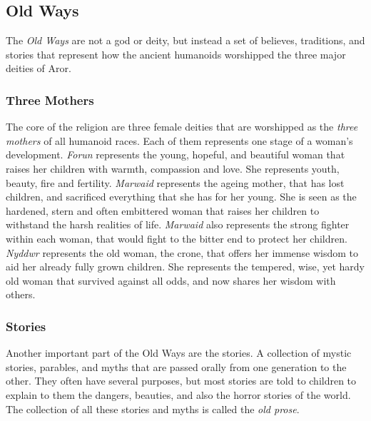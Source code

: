 \subsection{Old Ways}

The \emph{Old Ways} are not a god or deity, but instead a set of believes,
traditions, and stories that represent how the ancient humanoids worshipped
the three major deities of Aror.

\subsubsection*{Three Mothers}

The core of the religion are three female deities that are worshipped as the
\emph{three mothers} of all humanoid races. Each of them represents one stage
of a woman's development. \emph{Forun} represents the young, hopeful, and
beautiful woman that raises her children with warmth, compassion and love. She
represents youth, beauty, fire and fertility. \emph{Marwaid} represents the
ageing mother, that has lost children, and sacrificed everything that she has
for her young. She is seen as the hardened, stern and often embittered woman
that raises her children to withstand the harsh realities of life.
\emph{Marwaid} also represents the strong fighter within each woman, that
would fight to the bitter end to protect her children. \emph{Nyddwr} represents
the old woman, the crone, that offers her immense wisdom to aid her already
fully grown children. She represents the tempered, wise, yet hardy old woman
that survived against all odds, and now shares her wisdom with others.

\subsubsection*{Stories}



Another important part of the Old Ways are the stories. A collection of mystic
stories, parables, and myths that are passed orally from one generation to the
other. They often have several purposes, but most stories are told to children
to explain to them the dangers, beauties, and also the horror stories of the
world. The collection of all these stories and myths is called the
\emph{old prose}.

